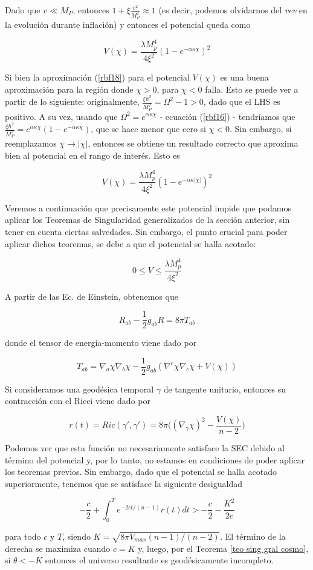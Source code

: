 Dado que $v \ll M_{P}$, entonces $1+\xi \frac{v^{2}}{M_{P}^{2}} \approx 1$ (es decir, podemos olvidarnos del \textit{vev} en la evolución durante inflación) y entonces el potencial queda como




\begin{equation}
V(\chi)=\frac{\lambda M_{p}^{4}}{4 \xi^{2}}(1-e^{-\alpha \kappa \chi})^{2}
\label{rbf18}
\end{equation}


Si bien la aproximación (\ref{rbf18}) para el potencial $V(\chi)$ es una buena aproximación para la región donde $\chi > 0$, para $\chi < 0$ falla. Esto se puede ver a partir de lo siguiente: originalmente, $\frac{\xi h^{2}}{M_{P}^{2}}=\Omega ^{2}-1>0$, dado que el LHS es positivo. A su vez, usando que $\Omega ^{2}=e^{\alpha \kappa \chi}$ - ecuación (\ref{rbf16}) - tendríamos que $\frac{\xi h^{2}}{M_{P}^{2}}=e^{\alpha \kappa \chi} (1-e^{-\alpha \kappa \chi})$, que se hace menor que cero si $\chi<0$. Sin embargo, si reemplazamos $\chi \rightarrow|\chi|$, entonces se obtiene un resultado correcto que aproxima bien al potencial en el rango de interés. Esto es


\begin{equation}
V(\chi)=\frac{\lambda M_{p}^{4}}{4 \xi^{2}}(1-e^{-\alpha \kappa |\chi|})^{2}
\label{rbf20}
\end{equation}

Veremos a continuación que precisamente este potencial impide que podamos aplicar los Teoremas de Singularidad generalizados de la sección anterior, sin tener en cuenta ciertas salvedades. Sin embargo, el punto crucial para poder aplicar dichos teoremas, se debe a que el potencial se halla acotado:


$$
0\leq V\leq\frac{\lambda M_{p}^{4}}{4 \xi^{2}}
$$


A partir de las Ec. de Einstein, obtenemos que 

$$
R_{ab}-\frac{1}{2}g_{ab}R=8\pi T_{ab}
$$

donde el tensor de energía-momento viene dado por \citep{2011CQGra..28l5009F}

$$
T_{ab}=\nabla_a \chi \nabla_b \chi-\frac{1}{2}g_{ab}(\nabla^c\chi \nabla_c\chi+V(\chi))
$$

Si consideramos una geodésica temporal $\gamma$ de tangente unitario, entonces su contracción con el Ricci viene dado por

$$
r(t)=Ric(\gamma',\gamma')=8\pi\bigg((\nabla_\gamma \chi)^2-\frac{V(\chi)}{n-2}\bigg)
$$

Podemos ver que esta función no necesariamente satisface la SEC debido al término del potencial y, por lo tanto, no estamos en condiciones de poder aplicar los teoremas previos. Sin embargo, dado que el potencial se halla acotado superiormente, tenemos que se satisface la siguiente desigualdad

$$
-\frac{c}{2}+\int_0^T e^{-2ct/(n-1)}r(t)dt>-\frac{c}{2}-\frac{K^2}{2c}
$$

para todo $c$ y $T$, siendo $K=\sqrt{8\pi V_{max}(n-1)/(n-2)}$. El término de la derecha se maximiza cuando $c=K$ y, luego, por el Teorema \ref{teo sing gral cosmo}, si $\theta<-K$ entonces el universo resultante es geodésicamente incompleto. 



